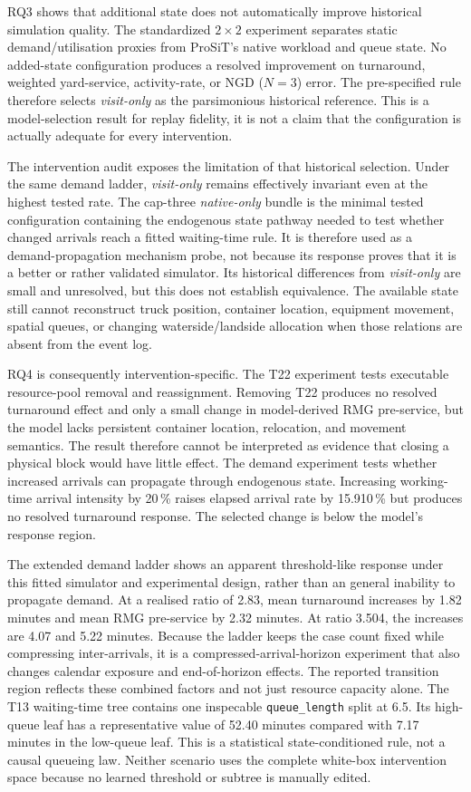 RQ3 shows that additional state does not automatically improve historical
simulation quality. The standardized $2\times2$ experiment separates static
demand/utilisation proxies from ProSiT's native workload and queue state.
No added-state configuration produces a resolved improvement on turnaround,
weighted yard-service, activity-rate, or NGD ($N=3$) error. The pre-specified rule
therefore selects \textit{visit-only} as the parsimonious historical reference.
This is a model-selection result for replay fidelity, it is not a claim that the
configuration is actually adequate for every intervention.

The intervention audit exposes the limitation of that historical selection.
Under the same demand ladder, \textit{visit-only} remains effectively invariant
even at the highest tested rate. The cap-three \textit{native-only} bundle is
the minimal tested configuration containing the endogenous state pathway
needed to test whether changed arrivals reach a fitted waiting-time rule. It is
therefore used as a demand-propagation mechanism probe, not because its
response proves that it is a better or rather validated simulator. Its historical
differences from
\textit{visit-only} are small and unresolved, but this does not establish
equivalence. The available state still cannot reconstruct truck position,
container location, equipment movement, spatial queues, or changing
waterside/landside allocation when those relations are absent from the event
log.

RQ4 is consequently intervention-specific. The T22 experiment tests executable
resource-pool removal and reassignment. Removing T22 produces no resolved
turnaround effect and only a small change in model-derived RMG pre-service, but
the model lacks persistent container location, relocation, and movement
semantics. The result therefore cannot be interpreted as evidence that closing
a physical block would have little effect. The demand experiment tests whether
increased arrivals can propagate through endogenous state. Increasing
working-time arrival intensity by 20\,\% raises elapsed arrival rate by
15.910\,\% but produces no resolved turnaround response. The selected change is
below the model's response region.

The extended demand ladder shows an apparent threshold-like response under
this fitted simulator and experimental design, rather than an general inability
to propagate demand. At a realised
ratio of 2.83, mean turnaround increases by 1.82 minutes and mean RMG
pre-service by 2.32 minutes. At ratio 3.504, the increases are 4.07 and
5.22 minutes.  Because the ladder keeps the case count fixed while
compressing inter-arrivals, it is a compressed-arrival-horizon
experiment that also changes calendar exposure and end-of-horizon effects.
The reported transition region reflects these combined factors and not just resource
capacity alone.
The T13 waiting-time tree contains one inspecable
\texttt{queue\_length} split at 6.5. Its high-queue leaf has a representative
value of 52.40 minutes compared with 7.17 minutes in the low-queue leaf.
This is a statistical state-conditioned rule, not a causal queueing law.
Neither scenario uses the complete white-box intervention space because
no learned threshold or subtree is manually edited.

